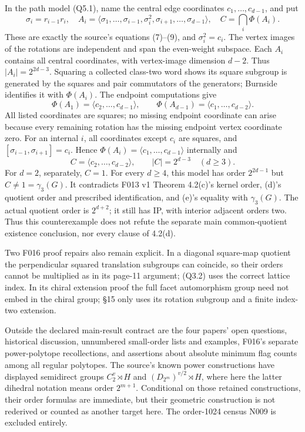 \documentclass[
  10pt,
  letterpaper,
]{article}
\begin{document}
In the path model (Q5.1), name the central edge coordinates
\(c_1,\ldots,c_{d-1}\), and put \[
 \sigma_i=r_{i-1}r_i,\quad
 A_i=\langle\sigma_1,\ldots,\sigma_{i-1},\sigma_i^2,
                  \sigma_{i+1},\ldots,\sigma_{d-1}\rangle,
 \quad C=\bigcap_i\Phi(A_i).                              \tag{Q10.1}
\] These are exactly the source's equations (7)--(9), and
\(\sigma_i^2=c_i\). The vertex images of the rotations are independent
and span the even-weight subspace. Each \(A_i\) contains all central
coordinates, with vertex-image dimension \(d-2\). Thus
\(|A_i|=2^{2d-3}\). Squaring a collected class-two word shows its square
subgroup is generated by the squares and pair commutators of the
generators; Burnside identifies it with \(\Phi(A_i)\). The endpoint
computations give \[
 \Phi(A_1)=\langle c_2,\ldots,c_{d-1}\rangle,\qquad
 \Phi(A_{d-1})=\langle c_1,\ldots,c_{d-2}\rangle.
\] All listed coordinates are squares; no missing endpoint coordinate
can arise because every remaining rotation has the missing endpoint
vertex coordinate zero. For an internal \(i\), all coordinates except
\(c_i\) are squares, and \([\sigma_{i-1},\sigma_{i+1}]=c_i\). Hence
\(\Phi(A_i)=\langle c_1,\ldots,c_{d-1}\rangle\) internally and \[
 C=\langle c_2,\ldots,c_{d-2}\rangle,\qquad |C|=2^{d-3}
 \quad(d\ge3).                                          \tag{Q10.2}
\] For \(d=2\), separately, \(C=1\). For every \(d\ge4\), this model has
order \(2^{2d-1}\) but \(C\ne1=\gamma_3(G)\). It contradicts F013 v1
Theorem 4.2(c)'s kernel order, (d)'s quotient order and prescribed
identification, and (e)'s equality with \(\gamma_3(G)\). The actual
quotient order is \(2^{d+2}\); it still has IP, with interior adjacent
orders two. Thus this counterexample does not refute the separate main
common-quotient existence conclusion, nor every clause of 4.2(d).

Two F016 proof repairs also remain explicit. In a diagonal square-map
quotient the perpendicular squared translation subgroups can coincide,
so their orders cannot be multiplied as in its page-11 argument; (Q3.2)
uses the correct lattice index. In its chiral extension proof the full
facet automorphism group need not embed in the chiral group; §15 only
uses its rotation subgroup and a finite index-two extension.

Outside the declared main-result contract are the four papers' open
questions, historical discussion, unnumbered small-order lists and
examples, F016's separate power-polytope recollections, and assertions
about absolute minimum flag counts among all regular polytopes. The
source's known power constructions have displayed semidirect groups
\(C_2^v\rtimes H\) and \((D_{2^m})^{v/2}\rtimes H\), where here the
latter dihedral notation means order \(2^{m+1}\). Conditional on those
retained constructions, their order formulas are immediate, but their
geometric construction is not rederived or counted as another target
here. The order-1024 census N009 is excluded entirely.
\end{document}
